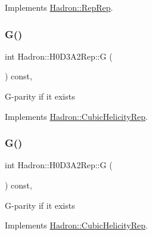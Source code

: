 Implements \mbox{\hyperlink{structHadron_1_1RepRep_a92c8802e5ed7afd7da43ccfd5b7cd92b}{Hadron\+::\+Rep\+Rep}}.

\mbox{\label{structHadron_1_1H0D3A2Rep_add1df3c4aec7ea1f7f37f8f3e9522cdd}} 
\subsubsection{\texorpdfstring{G()}{G()}\hspace{0.1cm}{\footnotesize\ttfamily [1/3]}}
{\footnotesize\ttfamily int Hadron\+::\+H0\+D3\+A2\+Rep\+::G (\begin{DoxyParamCaption}{ }\end{DoxyParamCaption}) const\hspace{0.3cm}{\ttfamily [inline]}, {\ttfamily [virtual]}}

G-\/parity if it exists 

Implements \mbox{\hyperlink{structHadron_1_1CubicHelicityRep_a50689f42be1e6170aa8cf6ad0597018b}{Hadron\+::\+Cubic\+Helicity\+Rep}}.

\mbox{\label{structHadron_1_1H0D3A2Rep_add1df3c4aec7ea1f7f37f8f3e9522cdd}} 
\subsubsection{\texorpdfstring{G()}{G()}\hspace{0.1cm}{\footnotesize\ttfamily [2/3]}}
{\footnotesize\ttfamily int Hadron\+::\+H0\+D3\+A2\+Rep\+::G (\begin{DoxyParamCaption}{ }\end{DoxyParamCaption}) const\hspace{0.3cm}{\ttfamily [inline]}, {\ttfamily [virtual]}}

G-\/parity if it exists 

Implements \mbox{\hyperlink{structHadron_1_1CubicHelicityRep_a50689f42be1e6170aa8cf6ad0597018b}{Hadron\+::\+Cubic\+Helicity\+Rep}}.

\mbox{\label{structHadron_1_1H0D3A2Rep_add1df3c4aec7ea1f7f37f8f3e9522cdd}} 
